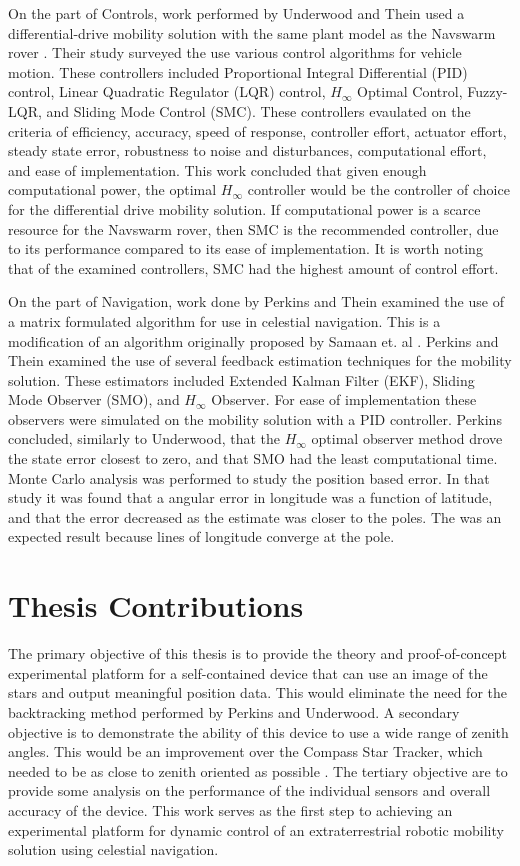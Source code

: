\documentclass[12pt,a4paper]{book}
\begin{document}
On the part of Controls, work performed by Underwood and Thein used a differential-drive mobility solution with the same plant model as the Navswarm rover \cite{b:underwood}.  Their study surveyed the use various control algorithms for vehicle motion.  These controllers included Proportional Integral Differential (PID) control, Linear Quadratic Regulator (LQR) control, $H_{\infty}$ Optimal Control, Fuzzy-LQR, and Sliding Mode Control (SMC).  These controllers evaulated on the criteria of efficiency, accuracy, speed of response, controller effort, actuator effort, steady state error, robustness to noise and disturbances, computational effort, and ease of implementation.  This work concluded that given enough computational power, the optimal $H_{\infty}$ controller would be the controller of choice for the differential drive mobility solution.  If computational power is a scarce resource for the Navswarm rover, then SMC is the recommended controller, due to its performance compared to its ease of implementation. It is worth noting that of the examined controllers, SMC had the highest amount of control effort.   

On the part of Navigation, work done by Perkins and Thein examined the use of a matrix formulated algorithm for use in celestial navigation.  This is a modification of an algorithm originally proposed by Samaan et. al \cite{b:gps}.  Perkins and Thein examined the use of several feedback estimation techniques for the mobility solution.  These estimators included Extended Kalman Filter (EKF), Sliding Mode Observer (SMO), and $H_{\infty}$ Observer.  For ease of implementation these observers were simulated on the mobility solution with a PID controller.  Perkins concluded, similarly to Underwood, that the $H_{\infty}$ optimal observer method drove the state error closest to zero, and that SMO had the least computational time.  Monte Carlo analysis was performed to study the position based error.  In that study it was found that a angular error in longitude was a function of latitude, and that the error decreased as the estimate was closer to the poles.  The was an expected result because lines of longitude converge at the pole.

\section{Thesis Contributions}
The primary objective of this thesis is to provide the theory and proof-of-concept experimental platform for a self-contained device that can use an image of the stars and output meaningful position data. This would eliminate the need for the backtracking method performed by Perkins and Underwood.  A secondary objective is to demonstrate the ability of this device to use a wide range of zenith angles.  This would be an improvement over the Compass Star Tracker, which needed to be as close to zenith oriented as possible \cite{b:swanzy}.  The tertiary objective are to provide some analysis on the performance of the individual sensors and overall accuracy of the device. This work serves as the first step to achieving an experimental platform for dynamic control of an extraterrestrial robotic mobility solution using celestial navigation.  
\end{document}
